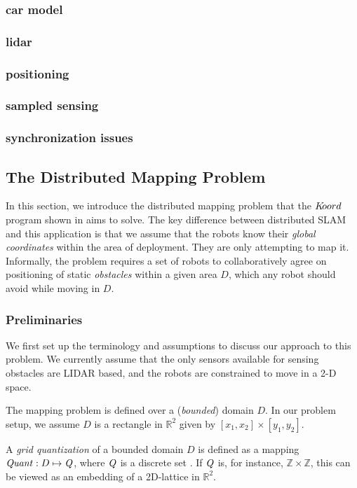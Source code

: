 \subsubsection{car model}
\subsubsection{lidar}
\subsubsection{positioning}
\subsubsection{sampled sensing}
\subsubsection{synchronization issues}
 
\subsection{The Distributed Mapping Problem}
In this section, we introduce the distributed mapping problem that the $K\kern-2pt oord$ program shown in  aims to solve. The key difference between distributed SLAM and this application is that we assume that the robots know their \emph{global coordinates} within the area of deployment. They are only attempting to map it. 
Informally, the problem requires a set of robots to collaboratively agree on positioning of static \emph{obstacles} within a given area $D$, which any robot should avoid while moving in $D$.

\subsubsection{Preliminaries}
We first set up the terminology and assumptions to discuss our approach to this problem. We currently assume that the only sensors available for sensing obstacles are LIDAR based, and the robots are constrained to move in a 2-D space.

The mapping problem is defined over a (\emph{bounded}) domain $D$. In our problem setup, we assume $D$ is a rectangle in $\mathbb{R}^2$ given by $[x_1,x_2]\times [y_1,y_2]$.

\begin{definition}
A \emph{grid quantization} of a bounded domain $D$ is defined as a mapping $\mathit{Quant}:D \mapsto \mathit{Q}$, where $\mathit{Q}$ is a discrete set . If $\mathit{Q}$ is, for instance, $\mathbb{Z}\times \mathbb{Z}$, this can be viewed as an embedding of a 2D-lattice in $\mathbb{R}^2$. 
\end{definition}

